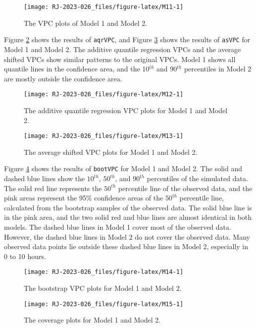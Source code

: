 \begin{figure}
\texttt{[image: RJ-2023-026\_files/figure-latex/M11-1]} \caption{The VPC plots of Model 1 and Model 2.}\label{fig:M11}
\end{figure}

Figure \ref{fig:M12} shows the results of \texttt{aqrVPC}, and Figure \ref{fig:M13} shows the results of \texttt{asVPC} for Model 1 and Model 2. The additive quantile regression VPCs and the average shifted VPCs show similar patterns to the original VPCs. Model 1 shows all quantile lines in the confidence area, and the 10\(^{th}\) and 90\(^{th}\) percentiles in Model 2 are mostly outside the confidence area.

\begin{figure}
\texttt{[image: RJ-2023-026\_files/figure-latex/M12-1]} \caption{The additive quantile regression VPC plots for Model 1 and Model 2.}\label{fig:M12}
\end{figure}

\begin{figure}
\texttt{[image: RJ-2023-026\_files/figure-latex/M13-1]} \caption{The average shifted VPC plots for Model 1 and Model 2.}\label{fig:M13}
\end{figure}

Figure \ref{fig:M14} shows the results of \texttt{bootVPC} for Model 1 and Model 2. The solid and dashed blue lines show the \(10^{th}\), \(50^{th}\), and \(90^{th}\) percentiles of the simulated data. The solid red line represents the \(50^{th}\) percentile line of the observed data, and the pink areas represent the 95\(\%\) confidence areas of the \(50^{th}\) percentile line, calculated from the bootstrap samples of the observed data.
The solid blue line is in the pink area, and the two solid red and blue lines are almost identical in both models.
The dashed blue lines in Model 1 cover most of the observed data. However, the dashed blue lines in Model 2 do not cover the observed data. Many observed data points lie outside these dashed blue lines in Model 2, especially in 0 to 10 hours.

\begin{figure}
\texttt{[image: RJ-2023-026\_files/figure-latex/M14-1]} \caption{The bootstrap VPC plots for Model 1 and Model 2.}\label{fig:M14}
\end{figure}

\begin{figure}
\texttt{[image: RJ-2023-026\_files/figure-latex/M15-1]} \caption{The coverage plots for Model 1 and Model 2.}\label{fig:M15}
\end{figure}

